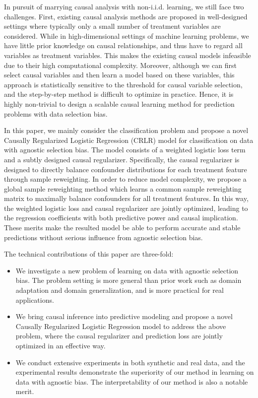 \documentclass[sigconf]{acmart}
\begin{document}
In pursuit of marrying causal analysis with non-i.i.d. learning, we still face two challenges. 
First, existing causal analysis methods are proposed in well-designed settings where typically only a small number of treatment variables are considered. 
While in high-dimensional settings of machine learning problems, we have little prior knowledge on causal relationships, and thus have to regard all variables as treatment variables. 
This makes the existing causal models infeasible due to their high computational complexity. 
Moreover, although we can first select causal variables and then learn a model based on these variables, this approach is statistically sensitive to the threshold for causal variable selection, and the step-by-step method is difficult to optimize in practice.
Hence, it is highly non-trivial to design a scalable causal learning method for prediction problems with data selection bias.

In this paper, we mainly consider the classification problem and propose a novel Causally Regularized Logistic Regression (CRLR) model for classification on data with agnostic selection bias.
The model consists of a weighted logistic loss term and a subtly designed causal regularizer. 
Specifically, the causal regularizer is designed to directly balance confounder distributions for each treatment feature through sample reweighting.
In order to reduce model complexity, we propose a global sample reweighting method which learns a common sample reweighting matrix to maximally balance confounders for all treatment features.
In this way, the weighted logistic loss and causal regularizer are jointly optimized, leading to the regression coefficients with both predictive power and causal implication. 
These merits make the resulted model be able to perform accurate and stable predictions without serious influence from agnostic selection bias.

The technical contributions of this paper are three-fold:
\begin{itemize}
  \item We investigate a new problem of learning on data with agnostic selection bias. 
  The problem setting is more general than prior work such as domain adaptation and domain generalization, and is more practical for real applications.
  \item We bring causal inference into predictive modeling and propose a novel Causally Regularized Logistic Regression model to address the above problem, where the causal regularizer and prediction loss are jointly optimized in an effective way.
  \item We conduct extensive experiments in both synthetic and real data, and the experimental results demonstrate the superiority of our method in learning on data with agnostic bias. 
  The interpretability of our method is also a notable merit.
\end{itemize}
\end{document}
